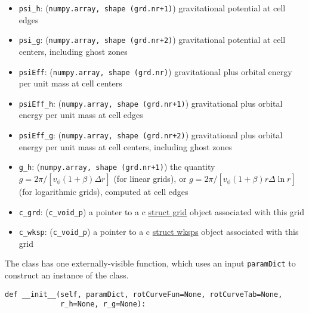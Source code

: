 \documentclass[12pt]{article}
\begin{document}
\begin{itemize}
\item \verb=psi_h=: (\verb=numpy.array, shape (grd.nr+1)=) gravitational potential at cell edges
\item \verb=psi_g=: (\verb=numpy.array, shape (grd.nr+2)=) gravitational potential at cell centers, including ghost zones
\item \verb=psiEff=: (\verb=numpy.array, shape (grd.nr)=) gravitational plus orbital energy per unit mass at cell centers
\item \verb=psiEff_h=: (\verb=numpy.array, shape (grd.nr+1)=) gravitational plus orbital energy per unit mass at cell edges
\item \verb=psiEff_g=: (\verb=numpy.array, shape (grd.nr+2)=) gravitational plus orbital energy per unit mass at cell centers, including ghost zones
\item \verb=g_h=: (\verb=numpy.array, shape (grd.nr+1)=) the quantity $g = 2 \pi / [v_\phi (1+\beta) \Delta r]$ (for linear grids), or  $g = 2 \pi / [v_\phi (1+\beta) r\Delta\ln r]$ (for logarithmic grids), computed at cell edges
\item \verb=c_grd=: (\verb=c_void_p=) a pointer to a c \hyperref[sssec:datastructures]{struct grid} object associated with this grid
\item \verb=c_wksp=: (\verb=c_void_p=) a pointer to a c \hyperref[sssec:datastructures]{struct wksps} object associated with this grid
\end{itemize}

The class has one externally-visible function, which uses an input \verb=paramDict= to construct an instance of the class.
\begin{verbatim}
def __init__(self, paramDict, rotCurveFun=None, rotCurveTab=None,
             r_h=None, r_g=None):
\end{verbatim}
\end{document}
